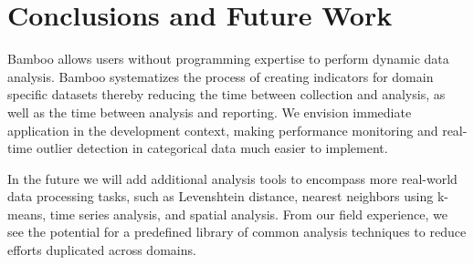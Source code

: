 \documentclass{sig-alternate}
\begin{document}

%
%

\section{Conclusions and Future Work}
Bamboo allows users without programming expertise to perform dynamic data analysis.  Bamboo systematizes the process of creating indicators for domain specific datasets thereby reducing the time between collection and analysis, as well as the time between analysis and reporting.
We envision immediate application in the development context, making performance monitoring \cite{berg} and real-time outlier detection in categorical data \cite{dimagi} much easier to implement. 

In the future we will add additional analysis tools to encompass more real-world data processing tasks, such as Levenshtein distance, nearest neighbors using k-means, time series analysis, and spatial analysis.  
From our field experience, we see the potential for a predefined library of common analysis techniques to reduce
efforts duplicated across domains.


%

%
%

\balancecolumns
\end{document}
